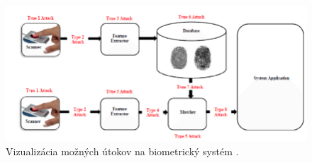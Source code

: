 \begin{figure}[hbt]
	\centering
	\includegraphics[width=\textwidth]{obrazky-figures/biometri-system-attacks.png}
	\caption{Vizualizácia možných útokov na biometrický systém \cite{biometric_authentication_threads1}.}
	\label{pic_auth_attacks}
\end{figure}

